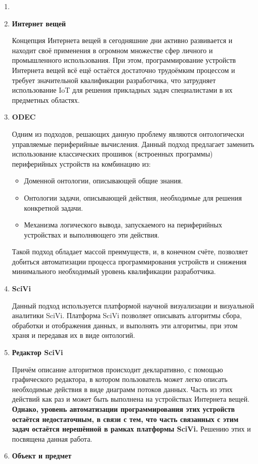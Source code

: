 \documentclass[14pt]{extarticle}
\begin{document}
\begin{enumerate}
	\item \textbf{}
	\item \textbf{Интернет вещей}

	Концепция Интернета вещей в сегодняшние дни активно развивается и находит своё применения в огромном множестве сфер личного и промышленного использования.
	При этом, программирование устройств Интернета вещей всё ещё остаётся достаточно трудоёмким процессом и требует значительной квалификации разработчика, что затрудняет использование IoT для решения прикладных задач специалистами в их предметных областях.
	\item \textbf{ODEC}

	Одним из подходов, решающих данную проблему являются онтологически управляемые периферийные вычисления.
	Данный подход предлагает заменить использование классических прошивок (встроенных программы) периферийных устройств на комбинацию из:
	\begin{itemize}
		\item Доменной онтологии, описывающей общие знания.
		\item Онтологии задачи, описывающей действия, необходимые для решения конкретной задачи.
		\item Механизма логического вывода, запускаемого на периферийных устройствах и выполняющего эти действия.
	\end{itemize}
	Такой подход обладает массой преимуществ, и, в конечном счёте, позволяет добиться автоматизации процесса программирования устройств и снижения минимального необходимый уровень квалификации разработчика.
	\item \textbf{SciVi}

	Данный подход используется платформой научной визуализации и визуальной аналитики SciVi.
	Платформа SciVi позволяет описывать алгоритмы сбора, обработки и отображения данных, и выполнять эти алгоритмы, при этом храня и передавая их в виде онтологий.
	\item \textbf{Редактор SciVi}

	Причём описание алгоритмов происходит декларативно, с помощью графического редактора, в котором пользователь может легко описать необходимые действия в виде диаграмм потоков данных.
	Часть из этих действий как раз и может быть выполнена на устройствах Интернета вещей.
	\textbf{Однако, уровень автоматизации программирования этих устройств остаётся недостаточным, в связи с тем, что часть связанных с этим задач остаётся нерешённой в рамках платформы SciVi.}
	Решению этих и посвящена данная работа.
	\item \textbf{Объект и предмет}


\end{enumerate}
\end{document}

